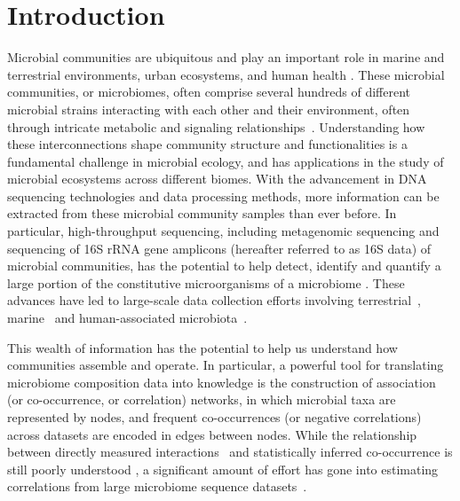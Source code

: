 
\section*{Introduction}

Microbial communities are ubiquitous and play an important role in marine and terrestrial environments, urban ecosystems, and human health \cite{Zhang2015,Thompson2017,Ghoul2016,HumanMicrobiomeProjectConsortium2012,royo-llonchCompendium530Metagenomeassembled2021,tedersooFungalBiogeographyGlobal2014}.
  These microbial communities, or microbiomes, often comprise several hundreds of different microbial strains interacting with each other and their environment, often through intricate metabolic and signaling relationships~\cite{lima-mendezDeterminantsCommunityStructure2015a,zelezniakMetabolicDependenciesDrive2015,coyteUnderstandingCompetitionCooperation2019,DSouza2018}.
  Understanding how these interconnections shape community structure and functionalities is a fundamental challenge in microbial ecology, and has applications in the study of microbial ecosystems across different biomes.
  With the advancement in DNA sequencing technologies \cite{Narihiro2017} and data processing methods,  more information can be extracted from these microbial community samples than ever before.
  In particular, high-throughput sequencing, including metagenomic sequencing and sequencing of 16S rRNA gene amplicons (hereafter referred to as 16S data) of microbial communities, has the potential to help detect, identify and quantify a large portion of the constitutive microorganisms of a microbiome \cite{Jovel2016,Lloyd-Price2016}.
  These advances have led to large-scale data collection efforts involving terrestrial~\cite{Thompson2017,gilbertMeetingReportTerabase2010,tedersooFungalBiogeographyGlobal2014}, marine~\cite{Zhang2015,lima-mendezDeterminantsCommunityStructure2015a,royo-llonchCompendium530Metagenomeassembled2021} and human-associated microbiota~\cite{HumanMicrobiomeProjectConsortium2012,proctorIntegrativeHumanMicrobiome2019,Lloyd-Price2016}.

 This wealth of information has the potential to help us understand how communities assemble and operate.
 In particular, a powerful tool for translating microbiome composition data into knowledge is the construction of association (or co-occurrence, or correlation) networks, in which  microbial taxa are represented by nodes, and frequent co-occurrences (or negative correlations) across datasets are encoded in edges between nodes.
 While the relationship between directly measured interactions~\cite{lubbeExometabolomicAnalysisCrossFeeding2017,Jian2020,Hsu2019} and statistically inferred co-occurrence is still poorly understood \cite{Zuniga2017,Rottjers2018}, a significant amount of effort has gone into estimating correlations from large microbiome sequence datasets~\cite{faustMicrobialInteractionsNetworks2012a,maEarthMicrobialCooccurrence2020a}.

